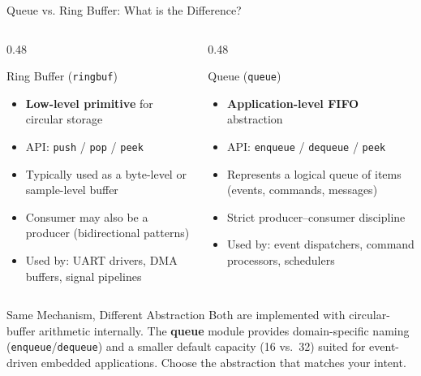 \documentclass[aspectratio=169, 10pt]{beamer}
\begin{document}
\begin{frame}{Queue vs. Ring Buffer: What is the Difference?}
\begin{columns}[T]
\begin{column}{0.48\textwidth}
\begin{block}{Ring Buffer (\texttt{ringbuf})}
\begin{itemize}
  \item \textbf{Low-level primitive} for circular storage
  \item API: \texttt{push} / \texttt{pop} / \texttt{peek}
  \item Typically used as a byte-level or sample-level buffer
  \item Consumer may also be a producer (bidirectional patterns)
  \item Used by: UART drivers, DMA buffers, signal pipelines
\end{itemize}
\end{block}
\end{column}

\begin{column}{0.48\textwidth}
\begin{block}{Queue (\texttt{queue})}
\begin{itemize}
  \item \textbf{Application-level FIFO} abstraction
  \item API: \texttt{enqueue} / \texttt{dequeue} / \texttt{peek}
  \item Represents a logical queue of items (events, commands, messages)
  \item Strict producer--consumer discipline
  \item Used by: event dispatchers, command processors, schedulers
\end{itemize}
\end{block}
\end{column}
\end{columns}

\vspace{0.5em}
\begin{alertblock}{Same Mechanism, Different Abstraction}
Both are implemented with circular-buffer arithmetic internally.
The \textbf{queue} module provides domain-specific naming
(\texttt{enqueue}/\texttt{dequeue}) and a smaller default capacity (16 vs.\ 32)
suited for event-driven embedded applications. Choose the abstraction
that matches your intent.
\end{alertblock}
\end{frame}
\end{document}
